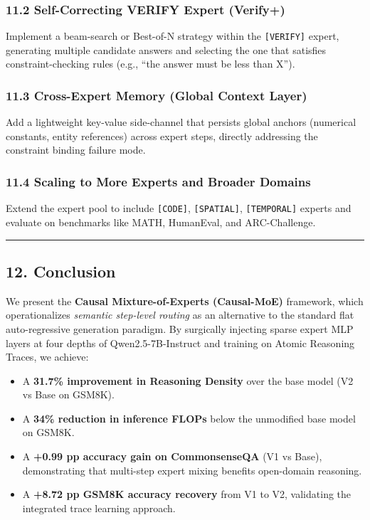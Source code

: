 \subsubsection{11.2 Self-Correcting VERIFY Expert
(Verify+)}\label{self-correcting-verify-expert-verify}

Implement a beam-search or Best-of-N strategy within the
\texttt{{[}VERIFY{]}} expert, generating multiple candidate answers and
selecting the one that satisfies constraint-checking rules (e.g., ``the
answer must be less than X'').

\subsubsection{11.3 Cross-Expert Memory (Global Context
Layer)}\label{cross-expert-memory-global-context-layer}

Add a lightweight key-value side-channel that persists global anchors
(numerical constants, entity references) across expert steps, directly
addressing the constraint binding failure mode.

\subsubsection{11.4 Scaling to More Experts and Broader
Domains}\label{scaling-to-more-experts-and-broader-domains}

Extend the expert pool to include \texttt{{[}CODE{]}},
\texttt{{[}SPATIAL{]}}, \texttt{{[}TEMPORAL{]}} experts and evaluate on
benchmarks like MATH, HumanEval, and ARC-Challenge.

\begin{center}\rule{0.5\linewidth}{0.5pt}\end{center}

\subsection{12. Conclusion}\label{conclusion}

We present the \textbf{Causal Mixture-of-Experts (Causal-MoE)}
framework, which operationalizes \emph{semantic step-level routing} as
an alternative to the standard flat auto-regressive generation paradigm.
By surgically injecting sparse expert MLP layers at four depths of
Qwen2.5-7B-Instruct and training on Atomic Reasoning Traces, we achieve:

\begin{itemize}
\tightlist
\item
  A \textbf{31.7\% improvement in Reasoning Density} over the base model
  (V2 vs Base on GSM8K).
\item
  A \textbf{34\% reduction in inference FLOPs} below the unmodified base
  model on GSM8K.
\item
  A \textbf{+0.99 pp accuracy gain on CommonsenseQA} (V1 vs Base),
  demonstrating that multi-step expert mixing benefits open-domain
  reasoning.
\item
  A \textbf{+8.72 pp GSM8K accuracy recovery} from V1 to V2, validating
  the integrated trace learning approach.
\end{itemize}

